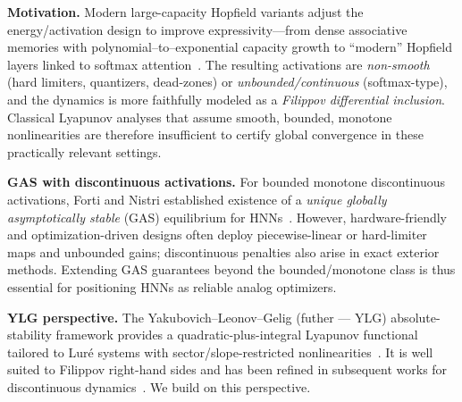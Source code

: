 \documentclass[journal]{IEEEtran}
\begin{document}
\textbf{Motivation.} Modern large-capacity Hopfield variants adjust the energy/activation design to
improve expressivity---from dense associative memories with polynomial--to--exponential capacity growth
\cite{krotovHopfield2016,demircigil2017} to ``modern'' Hopfield layers
linked to softmax attention~\cite{ramsauer2020}. The resulting activations are
\emph{non-smooth} (hard limiters, quantizers, dead-zones) or \emph{unbounded/continuous} (softmax-type),
and the dynamics is more faithfully modeled as a \emph{Filippov differential inclusion}.
Classical Lyapunov analyses that assume smooth, bounded, monotone nonlinearities are therefore
insufficient to certify global convergence in these practically relevant settings.

\textbf{GAS with discontinuous activations.}
For bounded monotone discontinuous activations, Forti and Nistri established existence of a
\emph{unique globally asymptotically stable} (GAS) equilibrium for HNNs~\cite{p1}.
However, hardware-friendly and optimization-driven designs often deploy
piecewise-linear or hard-limiter maps and unbounded gains; discontinuous penalties also arise in exact
exterior methods. Extending GAS guarantees beyond the bounded/monotone class is thus essential
for positioning HNNs as reliable analog optimizers.

\textbf{YLG perspective.}
The Yakubovich--Leonov--Gelig (futher --- YLG) absolute-stability framework provides a quadratic-plus-integral
Lyapunov functional tailored to Lur\'e systems with sector/slope-restricted nonlinearities~\cite{YLG}.
It is well suited to Filippov right-hand sides and has been refined in subsequent works for
discontinuous dynamics~\cite{Boikov2008,RajchakitAgarwalRamalingam2021}. We build on this perspective.
\end{document}
